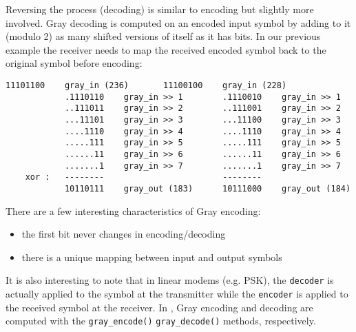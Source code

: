 Reversing the process (decoding) is similar to encoding but slightly
more involved.
Gray decoding is computed on an encoded input symbol by adding to it
(modulo 2) as many shifted versions of itself as it has bits.
In our previous example the receiver needs to map the received encoded
symbol back to the original symbol before encoding:
%
\begin{Verbatim}[fontsize=\small]
            11101100    gray_in (236)       11100100    gray_in (228)
            .1110110    gray_in >> 1        .1110010    gray_in >> 1
            ..111011    gray_in >> 2        ..111001    gray_in >> 2
            ...11101    gray_in >> 3        ...11100    gray_in >> 3
            ....1110    gray_in >> 4        ....1110    gray_in >> 4
            .....111    gray_in >> 5        .....111    gray_in >> 5
            ......11    gray_in >> 6        ......11    gray_in >> 6
            .......1    gray_in >> 7        .......1    gray_in >> 7
    xor :   --------                        --------
            10110111    gray_out (183)      10111000    gray_out (184)
\end{Verbatim}
%
There are a few interesting characteristics of Gray encoding:
\begin{itemize}
\item the first bit never changes in encoding/decoding
\item there is a unique mapping between input and output symbols
\end{itemize}
It is also interesting to note that in linear modems (e.g. PSK), the
{\tt decoder} is actually applied to the symbol at the transmitter while the
{\tt encoder} is applied to the received symbol at the receiver.
In \liquid, Gray encoding and decoding are computed with the
{\tt gray\_encode()} {\tt gray\_decode()} methods, respectively.

